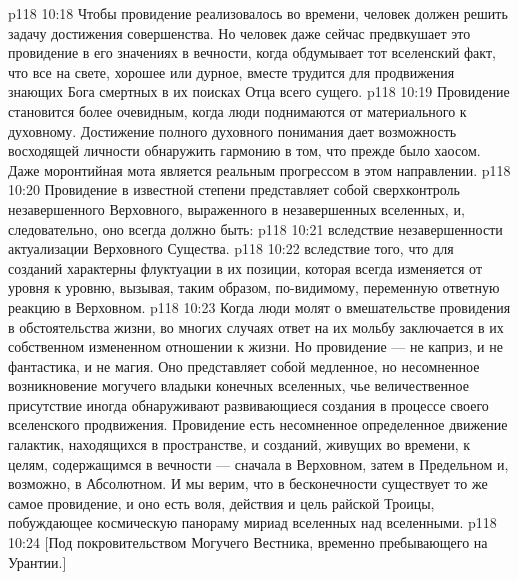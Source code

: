 \vs p118 10:18 Чтобы провидение реализовалось во времени, человек должен решить задачу достижения совершенства. Но человек даже сейчас предвкушает это провидение в его значениях в вечности, когда обдумывает тот вселенский факт, что все на свете, хорошее или дурное, вместе трудится для продвижения знающих Бога смертных в их поисках Отца всего сущего.
\vs p118 10:19 \pc Провидение становится более очевидным, когда люди поднимаются от материального к духовному. Достижение полного духовного понимания дает возможность восходящей личности обнаружить гармонию в том, что прежде было хаосом. Даже моронтийная мота является реальным прогрессом в этом направлении.
\vs p118 10:20 Провидение в известной степени представляет собой сверхконтроль незавершенного Верховного, выраженного в незавершенных вселенных, и, следовательно, оно всегда должно быть:
\vs p118 10:21 \bibnobreakspace {} вследствие незавершенности актуализации Верховного Существа.
\vs p118 10:22 \bibnobreakspace {} вследствие того, что для созданий характерны флуктуации в их позиции, которая всегда изменяется от уровня к уровню, вызывая, таким образом, по\hyp{}видимому, переменную ответную реакцию в Верховном.
\vs p118 10:23 \pc Когда люди молят о вмешательстве провидения в обстоятельства жизни, во многих случаях ответ на их мольбу заключается в их собственном измененном отношении к жизни. Но провидение --- не каприз, и не фантастика, и не магия. Оно представляет собой медленное, но несомненное возникновение могучего владыки конечных вселенных, чье величественное присутствие иногда обнаруживают развивающиеся создания в процессе своего вселенского продвижения. Провидение есть несомненное определенное движение галактик, находящихся в пространстве, и созданий, живущих во времени, к целям, содержащимся в вечности --- сначала в Верховном, затем в Предельном и, возможно, в Абсолютном. И мы верим, что в бесконечности существует то же самое провидение, и оно есть воля, действия и цель райской Троицы, побуждающее космическую панораму мириад вселенных над вселенными.
\vsetoff
\vs p118 10:24 [Под покровительством Могучего Вестника, временно пребывающего на Урантии.]
